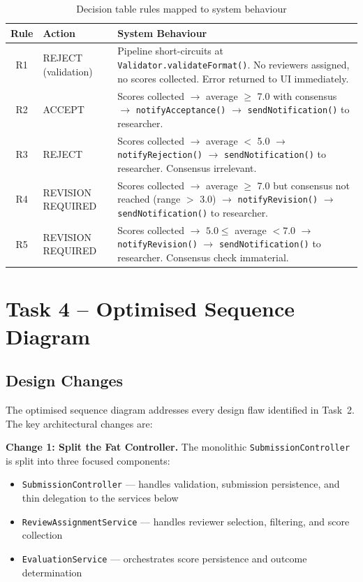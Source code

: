 \documentclass[12pt, a4paper]{article}
\begin{document}
\begin{table}[h]
\centering
\caption{Decision table rules mapped to system behaviour}
\label{tab:rule-behaviour}
\begin{tabularx}{\textwidth}{c l X}
    \toprule
    \textbf{Rule} & \textbf{Action} & \textbf{System Behaviour} \\
    \midrule
    R1 & REJECT (validation) & Pipeline short-circuits at \texttt{Validator.validateFormat()}. No reviewers assigned, no scores collected. Error returned to UI immediately. \\
    R2 & ACCEPT & Scores collected $\rightarrow$ average $\geq$ 7.0 with consensus $\rightarrow$ \texttt{notifyAcceptance()} $\rightarrow$ \texttt{sendNotification()} to researcher. \\
    R3 & REJECT & Scores collected $\rightarrow$ average $<$ 5.0 $\rightarrow$ \texttt{notifyRejection()} $\rightarrow$ \texttt{sendNotification()} to researcher. Consensus irrelevant. \\
    R4 & REVISION REQUIRED & Scores collected $\rightarrow$ average $\geq$ 7.0 but consensus not reached (range $>$ 3.0) $\rightarrow$ \texttt{notifyRevision()} $\rightarrow$ \texttt{sendNotification()} to researcher. \\
    R5 & REVISION REQUIRED & Scores collected $\rightarrow$ $5.0 \leq$ average $< 7.0$ $\rightarrow$ \texttt{notifyRevision()} $\rightarrow$ \texttt{sendNotification()} to researcher. Consensus check immaterial. \\
    \bottomrule
\end{tabularx}
\end{table}

\section{Task 4 -- Optimised Sequence Diagram}
\label{sec:task4}

\subsection{Design Changes}

The optimised sequence diagram addresses every design flaw identified in Task~2. The key architectural changes are:

\textbf{Change 1: Split the Fat Controller.}
The monolithic \texttt{SubmissionController} is split into three focused components:
\begin{itemize}[nosep]
    \item \texttt{SubmissionController} --- handles validation, submission persistence, and thin delegation to the services below
    \item \texttt{ReviewAssignmentService} --- handles reviewer selection, filtering, and score collection
    \item \texttt{EvaluationService} --- orchestrates score persistence and outcome determination
\end{itemize}
\end{document}
